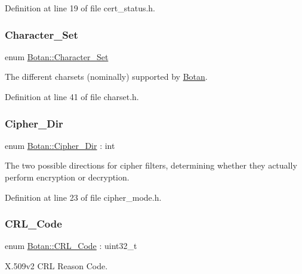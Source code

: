 Definition at line 19 of file cert\+\_\+status.\+h.

\mbox{\label{namespace_botan_a416eb1af7496d74b885a20ff833e9b33}} 
\subsubsection{\texorpdfstring{Character\+\_\+\+Set}{Character\_Set}}
{\footnotesize\ttfamily enum \mbox{\hyperlink{namespace_botan_a416eb1af7496d74b885a20ff833e9b33}{Botan\+::\+Character\+\_\+\+Set}}}

The different charsets (nominally) supported by \mbox{\hyperlink{namespace_botan}{Botan}}. 

Definition at line 41 of file charset.\+h.

\mbox{\label{namespace_botan_a8d9547a8fb3e868810b169b20ac389ee}} 
\subsubsection{\texorpdfstring{Cipher\+\_\+\+Dir}{Cipher\_Dir}}
{\footnotesize\ttfamily enum \mbox{\hyperlink{namespace_botan_a8d9547a8fb3e868810b169b20ac389ee}{Botan\+::\+Cipher\+\_\+\+Dir}} \+: int}

The two possible directions for cipher filters, determining whether they actually perform encryption or decryption. 

Definition at line 23 of file cipher\+\_\+mode.\+h.

\mbox{\label{namespace_botan_a557e654e0c387a4ef2521e3ece516ca7}} 
\subsubsection{\texorpdfstring{C\+R\+L\+\_\+\+Code}{CRL\_Code}}
{\footnotesize\ttfamily enum \mbox{\hyperlink{namespace_botan_a557e654e0c387a4ef2521e3ece516ca7}{Botan\+::\+C\+R\+L\+\_\+\+Code}} \+: uint32\+\_\+t}

X.\+509v2 C\+RL Reason Code. 

